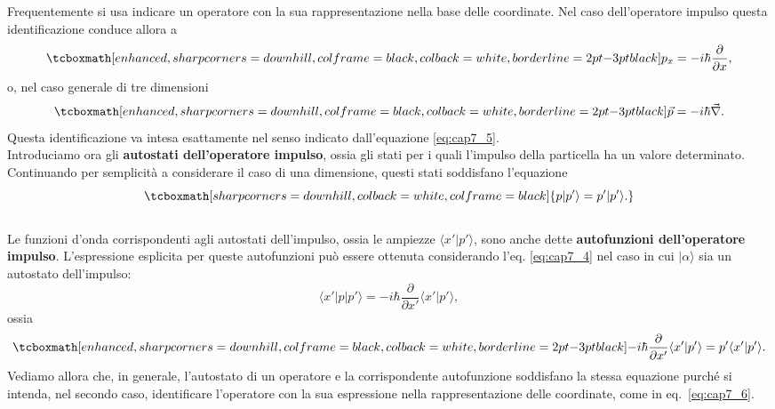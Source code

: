 Frequentemente si usa indicare un operatore con la sua rappresentazione nella base delle coordinate. Nel caso dell'operatore impulso questa identificazione conduce allora a
	\begin{equation}
		\label{eq:cap7_6}
		\tcboxmath[enhanced, sharp corners=downhill, colframe=black, colback=white, borderline={2pt}{-3pt}{black}]{
			p_x= -i\hbar \frac{\partial}{\partial x} ,
			}
	\end{equation}
o, nel caso generale di tre dimensioni
	\begin{equation}
		\tcboxmath[enhanced, sharp corners=downhill, colframe=black, colback=white, borderline={2pt}{-3pt}{black}]{
			\vec{p}= -i\hbar \vec{\nabla}.
			}
	\end{equation}
Questa identificazione va intesa esattamente nel senso indicato dall'equazione \eqref{eq:cap7_5}.\\

Introduciamo ora gli \textbf{autostati dell'operatore impulso}, ossia gli stati per i quali l'impulso della particella ha un valore determinato. Continuando per semplicità a considerare il caso di una dimensione, questi stati soddisfano l'equazione
	\begin{equation}
		\tcboxmath[sharp corners=downhill, colback=white, colframe=black]{
			p | p' \rangle = p' | p' \rangle.
			}
	\end{equation}\\
	
Le funzioni d'onda corrispondenti agli autostati dell'impulso, ossia le ampiezze $\langle x' | p' \rangle$, sono anche dette \textbf{autofunzioni dell'operatore impulso}. L'espressione esplicita per queste autofunzioni può essere ottenuta considerando l'eq. \eqref{eq:cap7_4} nel caso in cui $| \alpha \rangle$ sia un autostato dell'impulso:
	\begin{equation}
		\langle x' | p | p' \rangle = -i \hbar \frac{\partial}{\partial x'} \langle x' | p' \rangle,
	\end{equation}
\noindent ossia
	\begin{equation}
		\label{eq:cap7_7}
		\tcboxmath[enhanced, sharp corners=downhill, colframe=black, colback=white, borderline={2pt}{-3pt}{black}]{
			-i \hbar \frac{\partial}{\partial x'} \langle x' | p' \rangle = p' \langle x' | p' \rangle.
			}
	\end{equation}
Vediamo allora che, in generale, l'autostato di un operatore e la corrispondente autofunzione soddisfano la stessa equazione purché si intenda, nel secondo caso, identificare l'operatore con la sua espressione nella rappresentazione delle coordinate, come in eq.~\eqref{eq:cap7_6}.\\

